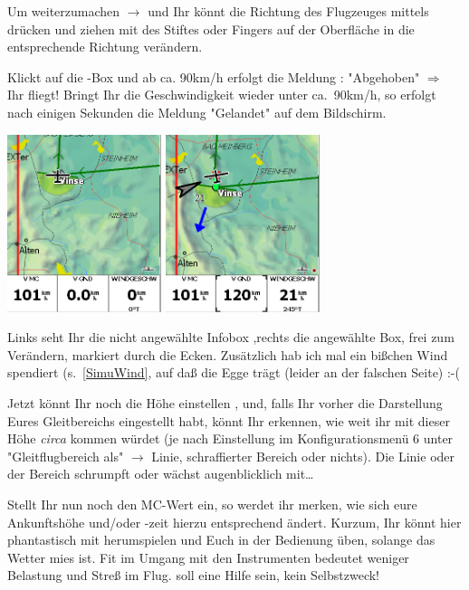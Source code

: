 Um weiterzumachen $\rightarrow$ \dklick und Ihr könnt die Richtung des Flugzeuges mittels drücken und ziehen mit des Stiftes oder Fingers auf der Oberfläche in die entsprechende Richtung verändern.

Klickt auf die -Box und ab ca. 90km/h erfolgt die Meldung : "Abgehoben" $\Longrightarrow$ Ihr fliegt! Bringt Ihr die Geschwindigkeit wieder unter ca.\ 90km/h, so erfolgt nach einigen Sekunden die Meldung "Gelandet" auf dem Bildschirm.
\begin{center}
\includegraphics[width=4.5cm]{Bilder/SimInfoBoxNaktiv.png}%
\qquad
\includegraphics[width=4.5cm]{Bilder/SimInfoBoxAktiv.png}%
\end{center}
Links seht Ihr die nicht angewählte Infobox ,rechts die angewählte Box, frei zum Verändern, markiert durch die Ecken.  Zusätzlich hab ich mal ein bißchen Wind spendiert (s.~\ref{SimuWind}, auf daß die Egge trägt (leider an der falschen Seite)  :-(

Jetzt könnt Ihr noch die Höhe einstellen , und, falls Ihr vorher die Darstellung Eures Gleitbereichs eingestellt habt, könnt Ihr erkennen,
wie weit ihr mit dieser Höhe \textit{circa} kommen würdet (je nach Einstellung im Konfigurationsmenü 6 unter 
"Gleitflugbereich als" $\rightarrow$ Linie, schraffierter Bereich oder nichts). Die Linie oder der Bereich schrumpft oder wächst augenblicklich mit\dots

Stellt Ihr nun noch den MC-Wert ein, so werdet ihr merken, wie sich eure Ankunftshöhe und/oder -zeit hierzu entsprechend ändert. Kurzum, Ihr könnt hier phantastisch mit herumspielen und Euch in der Bedienung üben, solange das Wetter mies ist. Fit im Umgang mit den Instrumenten bedeutet weniger Belastung und Streß im Flug. \xc soll eine Hilfe sein, kein Selbstzweck!

